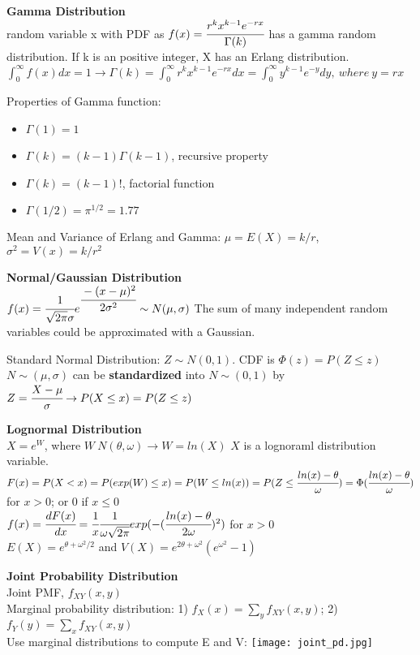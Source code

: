 \documentclass[a4paper,10pt]{article}
\begin{document}
\begin{multicols}{2}
\textbf{Gamma Distribution}\\
random variable x with PDF as $f(x)=\cfrac{r^kx^{k-1}e^{-rx}}{\Gamma(k)}$ has a gamma random distribution. If k is an positive integer, X has an Erlang distribution.\\
$\int_0^{\infty}f(x)dx=1 \rightarrow \Gamma(k)=\int_{0}^{\infty}r^k x^{k-1}e^{-rx}dx=\int_0^{\infty}y^{k-1}e^{-y}dy,\ where\ y=rx$

Properties of Gamma function:
\begin{itemize}
    \item $\Gamma(1)=1$
    \item $\Gamma(k)=(k-1)\Gamma(k-1)$, recursive property
    \item $\Gamma(k)=(k-1)!$, factorial function
    \item $\Gamma(1/2)=\pi^{1/2}=1.77$
\end{itemize}
Mean and Variance of Erlang and Gamma:
$\mu=E(X)=k/r$, $\sigma^2=V(x)=k/r^2$

\textbf{Normal/Gaussian Distribution}\\
$f(x)=\cfrac{1}{\sqrt{2\pi}\sigma}e^{\cfrac{-(x-\mu)^2}{2\sigma^2}}\sim N(\mu,\sigma)$
The sum of many independent random variables could be approximated with a Gaussian.

Standard Normal Distribution: $Z\sim N(0, 1)$. CDF is $\Phi(z)=P(Z\le z)$\\
$N\sim(\mu,\sigma)$ can be \textbf{standardized} into $N\sim(0,1)$ by $Z=\cfrac{X-\mu}{\sigma}\rightarrow P(X\le x)=P(Z\le z)$

\textbf{Lognormal Distribution}\\
$X=e^W$, where $W~N(\theta,\omega)\rightarrow W=ln(X)$
$X$ is a lognoraml distribution variable. 
$F(x)=P(X<x)=P(exp(W)\le x)=P(W\le ln(x))=P(Z\le \cfrac{ln(x)-\theta}{\omega})=\Phi(\cfrac{ln(x)-\theta}{\omega})$ for $x>0$; or 0 if $x\le 0$\\
$f(x)=\cfrac{dF(x)}{dx}=\cfrac{1}{x}\cfrac{1}{\omega\sqrt{2\pi}}exp(-(\cfrac{ln(x)-\theta}{2\omega})^2)$ for $x>0$\\
$E(X)=e^{\theta+\omega^2/2}$ and $V(X)=e^{2\theta+\omega^2}(e^{\omega^2}-1)$

\textbf{Joint Probability Distribution}\\
Joint PMF, $f_{XY}(x,y)$\\
Marginal probability distribution: 1) $f_X(x)=\sum_yf_{XY}(x,y)$; 2) $f_Y(y)=\sum_xf_{XY}(x,y)$\\
Use marginal distributions to compute E and V:
\texttt{[image: joint\_pd.jpg]}


\end{multicols}
\end{document}
